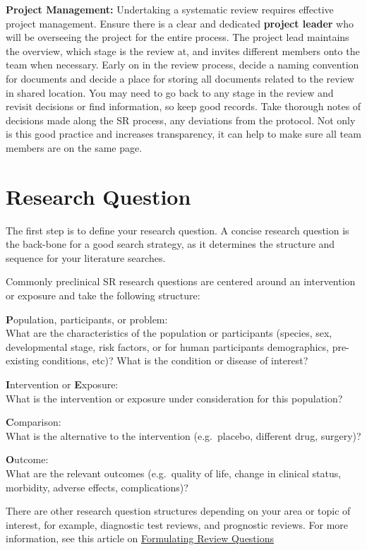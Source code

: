 \documentclass[
]{book}
\begin{document}
\textbf{Project Management:}
Undertaking a systematic review requires effective project management.
Ensure there is a clear and dedicated \textbf{project leader} who will be overseeing the project for the entire process. The project lead maintains the overview, which stage is the review at, and invites different members onto the team when necessary.
Early on in the review process, decide a naming convention for documents and decide a place for storing all documents related to the review in shared location. You may need to go back to any stage in the review and revisit decisions or find information, so keep good records. Take thorough notes of decisions made along the SR process, any deviations from the protocol. Not only is this good practice and increases transparency, it can help to make sure all team members are on the same page.

\hypertarget{researchquestion}{%
\chapter{Research Question}\label{researchquestion}}

The first step is to define your research question. A concise research question is the back-bone for a good search strategy, as it determines the structure and sequence for your literature searches.

Commonly preclinical SR research questions are centered around an intervention or exposure and take the following structure:

\textbf{P}opulation, participants, or problem:\\
What are the characteristics of the population or participants (species, sex, developmental stage, risk factors, or for human participants demographics, pre-existing conditions, etc)?
What is the condition or disease of interest?

\textbf{I}ntervention or \textbf{E}xposure:\\
What is the intervention or exposure under consideration for this population?

\textbf{C}omparison:\\
What is the alternative to the intervention (e.g.~placebo, different drug, surgery)?

\textbf{O}utcome:\\
What are the relevant outcomes (e.g.~quality of life, change in clinical status, morbidity, adverse effects, complications)?

There are other research question structures depending on your area or topic of interest, for example, diagnostic test reviews, and prognostic reviews.
For more information, see this article on \href{https://journals.library.ualberta.ca/eblip/index.php/EBLIP/article/view/9741/8144}{Formulating Review Questions}
\end{document}
